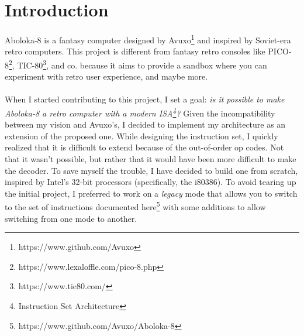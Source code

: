 \chapter{Introduction}

\indent Aboloka-8 is a fantasy computer designed by Avuxo\footnote{https://www.github.com/Avuxo} and inspired by Soviet-era retro computers.
This project is different from fantasy retro consoles like PICO-8\footnote{https://www.lexaloffle.com/pico-8.php}, TIC-80\footnote{https://www.tic80.com/}, and co. because it aims to provide a sandbox where you can experiment with retro user experience, and maybe more.
\\
\\
\noindent When I started contributing to this project, I set a goal: \textit{is it possible to make Aboloka-8 a retro computer with a modern ISA\footnote{Instruction Set Architecture}?} Given the incompatibility between my vision and Avuxo's, I decided to implement my architecture as an extension of the proposed one. While designing the instruction set, I quickly realized that it is difficult to extend because of the out-of-order op codes. Not that it wasn't possible, but rather that it would have been more difficult to make the decoder. To save myself the trouble, I have decided to build one from scratch, inspired by Intel's 32-bit processors (specifically, the i80386). To avoid tearing up the initial project, I preferred to work on a \textit{legacy} mode that allows you to switch to the set of instructions documented here\footnote{https://www.github.com/Avuxo/Aboloka-8} with some additions to allow switching from one mode to another.